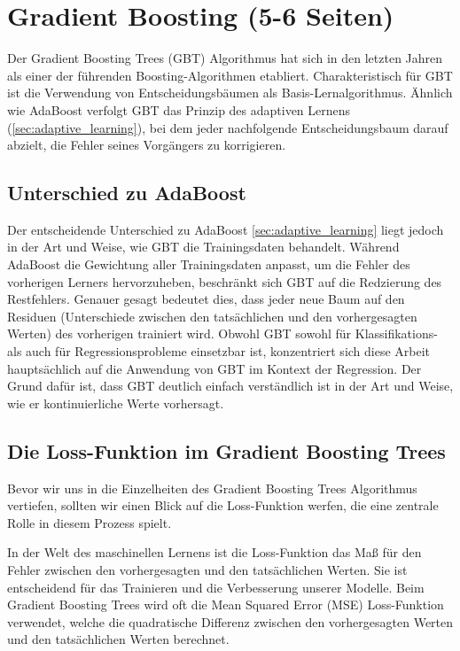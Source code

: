 \section{Gradient Boosting (5-6 Seiten)}
Der Gradient Boosting Trees (GBT) Algorithmus hat sich in den letzten Jahren als einer der führenden Boosting-Algorithmen etabliert. Charakteristisch für GBT ist die Verwendung von Entscheidungsbäumen als Basis-Lernalgorithmus. Ähnlich wie AdaBoost verfolgt GBT das Prinzip des adaptiven Lernens (\autoref{sec:adaptive_learning}), bei dem jeder nachfolgende Entscheidungsbaum darauf abzielt, die Fehler seines Vorgängers zu korrigieren.

\subsection{Unterschied zu AdaBoost}
Der entscheidende Unterschied zu AdaBoost \ref{sec:adaptive_learning} liegt jedoch in der Art und Weise, wie GBT die Trainingsdaten behandelt. Während AdaBoost die Gewichtung aller Trainingsdaten anpasst, um die Fehler des vorherigen Lerners hervorzuheben, beschränkt sich GBT auf die Redzierung des Restfehlers.
Genauer gesagt bedeutet dies, dass jeder neue Baum auf den Residuen (Unterschiede zwischen den tatsächlichen und den vorhergesagten Werten) des vorherigen trainiert wird.
\newline
Obwohl GBT sowohl für Klassifikations- als auch für Regressionsprobleme einsetzbar ist, konzentriert sich diese Arbeit hauptsächlich auf die Anwendung von GBT im Kontext der Regression. 
Der Grund dafür ist, dass GBT deutlich einfach verständlich ist in der Art und Weise, wie er kontinuierliche Werte vorhersagt.
\newline

\subsection{Die Loss-Funktion im Gradient Boosting Trees}
Bevor wir uns in die Einzelheiten des Gradient Boosting Trees Algorithmus vertiefen, sollten wir einen Blick auf die Loss-Funktion werfen, die eine zentrale Rolle in diesem Prozess spielt. 

In der Welt des maschinellen Lernens ist die Loss-Funktion das Maß für den Fehler zwischen den vorhergesagten und den tatsächlichen Werten. Sie ist entscheidend für das Trainieren und die Verbesserung unserer Modelle. Beim Gradient Boosting Trees wird oft die Mean Squared Error (MSE) Loss-Funktion verwendet, welche die quadratische Differenz zwischen den vorhergesagten Werten und den tatsächlichen Werten berechnet. 

